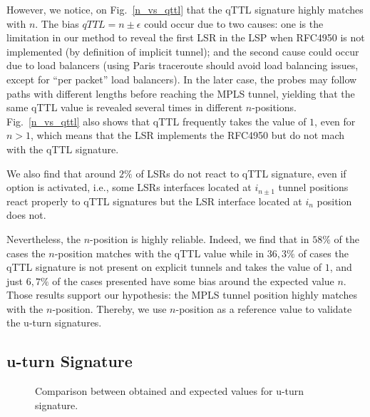 However, we notice, on Fig.~\ref{n_vs_qttl} that the qTTL signature highly
matches with $n$.   The bias $\textit{qTTL}=n \pm \epsilon$ could occur due to
two causes: one is the limitation in our method to reveal the first LSR in the
LSP when RFC4950 is not implemented (by definition of implicit tunnel); and the
second cause could occur due to load balancers (using Paris traceroute should
avoid load balancing issues, except for ``per packet'' load balancers).
In the later case, the \traceroute probes may follow paths with different
lengths before reaching the MPLS tunnel, yielding that the same qTTL value is
revealed several times in different $n$-positions. Fig.~\ref{n_vs_qttl} also
shows that qTTL frequently takes the value of $1$, even for $n>1$, which means
that the LSR implements the RFC4950 but do not mach with the qTTL signature.


We also find that around $2\%$ of LSRs do not react to qTTL signature, even
if \tpropagate option is activated, i.e., some LSRs interfaces located at
$i_{n \pm 1}$ tunnel positions react properly to qTTL signatures but the LSR
interface located at $i_n$ position does not.


Nevertheless, the $n$-position is highly reliable. Indeed, we find that in
$58\%$ of the cases the $n$-position matches with the qTTL value while in
$36,3\%$ of cases the qTTL signature is not present on explicit tunnels and takes the value of $1$,
and just $6,7\%$ of the cases presented have some bias around the expected value
$n$. Those results support our hypothesis: the  MPLS tunnel position highly
matches with the $n$-position. Thereby,  we use $n$-position as a reference
value to validate the u-turn signatures.

\subsection{u-turn Signature}\label{validation.uturn}
\begin{figure}[!t]
  \begin{center}    
\hspace{-0.3cm}      
  \end{center}
  \caption{Comparison between obtained and expected values for u-turn
  signature.}
  \label{validation.uturn.fig}
\end{figure}

